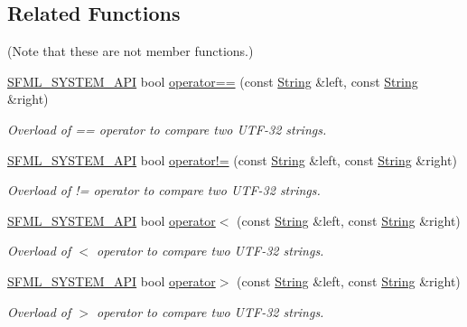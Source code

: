\subsection*{Related Functions}
(Note that these are not member functions.) \begin{DoxyCompactItemize}
\item 
\hyperlink{_system_2_export_8hpp_a6476c9e422606477a4c23d92b1d79a1f}{S\-F\-M\-L\-\_\-\-S\-Y\-S\-T\-E\-M\-\_\-\-A\-P\-I} bool \hyperlink{classsf_1_1_string_a2a385459fa9a237e61a712fa956d489e}{operator==} (const \hyperlink{classsf_1_1_string}{String} \&left, const \hyperlink{classsf_1_1_string}{String} \&right)
\begin{DoxyCompactList}\small\item\em Overload of == operator to compare two U\-T\-F-\/32 strings. \end{DoxyCompactList}\item 
\hyperlink{_system_2_export_8hpp_a6476c9e422606477a4c23d92b1d79a1f}{S\-F\-M\-L\-\_\-\-S\-Y\-S\-T\-E\-M\-\_\-\-A\-P\-I} bool \hyperlink{classsf_1_1_string_a2b592c36be218b4811795fdc84eecc69}{operator!=} (const \hyperlink{classsf_1_1_string}{String} \&left, const \hyperlink{classsf_1_1_string}{String} \&right)
\begin{DoxyCompactList}\small\item\em Overload of != operator to compare two U\-T\-F-\/32 strings. \end{DoxyCompactList}\item 
\hyperlink{_system_2_export_8hpp_a6476c9e422606477a4c23d92b1d79a1f}{S\-F\-M\-L\-\_\-\-S\-Y\-S\-T\-E\-M\-\_\-\-A\-P\-I} bool \hyperlink{classsf_1_1_string_ac2ca5a7703402a2bbafd85eec6d1e846}{operator$<$} (const \hyperlink{classsf_1_1_string}{String} \&left, const \hyperlink{classsf_1_1_string}{String} \&right)
\begin{DoxyCompactList}\small\item\em Overload of $<$ operator to compare two U\-T\-F-\/32 strings. \end{DoxyCompactList}\item 
\hyperlink{_system_2_export_8hpp_a6476c9e422606477a4c23d92b1d79a1f}{S\-F\-M\-L\-\_\-\-S\-Y\-S\-T\-E\-M\-\_\-\-A\-P\-I} bool \hyperlink{classsf_1_1_string_a5efc1eca58cf5c17d01eb8501d303538}{operator$>$} (const \hyperlink{classsf_1_1_string}{String} \&left, const \hyperlink{classsf_1_1_string}{String} \&right)
\begin{DoxyCompactList}\small\item\em Overload of $>$ operator to compare two U\-T\-F-\/32 strings. \end{DoxyCompactList}\item 

\end{DoxyCompactItemize}
